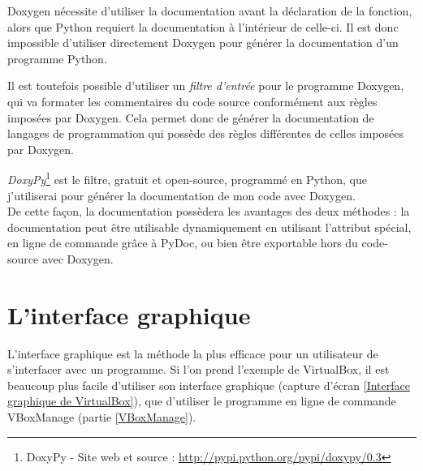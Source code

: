 Doxygen nécessite d'utiliser la documentation avant la déclaration de la fonction, alors que Python requiert la documentation à l'intérieur de celle-ci.
Il est donc impossible d'utiliser directement Doxygen pour générer la documentation d'un programme Python.

Il est toutefois possible d'utiliser un \textit{filtre d'entrée} pour le programme Doxygen, qui va formater les commentaires du code source conformément aux règles imposées par Doxygen.
Cela permet donc de générer la documentation de langages de programmation qui possède des règles différentes de celles imposées par Doxygen.

\textit{DoxyPy}\footnote{DoxyPy - Site web et source : \href{http://pypi.python.org/pypi/doxypy/0.3}{http://pypi.python.org/pypi/doxypy/0.3}} est le filtre, gratuit et open-source, programmé en Python, que j'utiliserai pour générer la documentation de mon code avec Doxygen.
\\


De cette façon, la documentation possèdera les avantages des deux méthodes : la documentation peut être utilisable dynamiquement en utilisant l'attribut spécial, en ligne de commande grâce à PyDoc, ou bien être exportable hors du code-source avec Doxygen.
\\






\section{L'interface graphique}

L'interface graphique est la méthode la plus efficace pour un utilisateur de s'interfacer avec un programme.
Si l'on prend l'exemple de VirtualBox, il est beaucoup plus facile d'utiliser son interface graphique (capture d'écran \ref{Interface graphique de VirtualBox}), que d'utiliser le programme en ligne de commande VBoxManage (partie \ref{VBoxManage}).
\\




